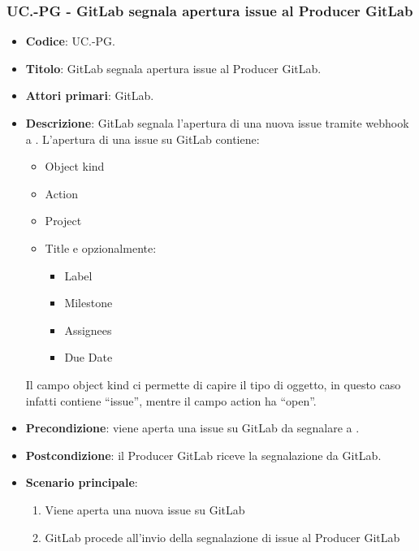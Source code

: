 \subsubsection{UC\theuccount.\thesubuccount-PG - GitLab segnala apertura issue al Producer GitLab}
\begin{itemize}
    \item \textbf{Codice}: UC\theuccount.\thesubuccount-PG.
    \item \textbf{Titolo}: GitLab segnala apertura issue al Producer GitLab.
    \item \textbf{Attori primari}: GitLab.
    \item \textbf{Descrizione}: GitLab segnala l'apertura di una nuova issue tramite webhook a \progetto.
    L'apertura di una issue su GitLab contiene:
    \begin{itemize}
        \item Object kind
        \item Action
        \item Project
        \item Title e opzionalmente:
        \begin{itemize}
            \item Label
            \item Milestone
            \item Assignees
            \item Due Date
        \end{itemize}
    \end{itemize}
    Il campo object kind ci permette di capire il tipo di oggetto, in questo caso infatti contiene ``issue'', mentre il campo action ha ``open''.
    \item \textbf{Precondizione}: viene aperta una issue su GitLab da 
    segnalare a \progetto.
    \item \textbf{Postcondizione}: il Producer GitLab riceve la segnalazione da GitLab.
    \item \textbf{Scenario principale}: 
    \begin{enumerate}
        \item Viene aperta una nuova issue su GitLab
        \item GitLab procede all'invio della segnalazione di issue al Producer GitLab
    \end{enumerate}
    
\end{itemize}


